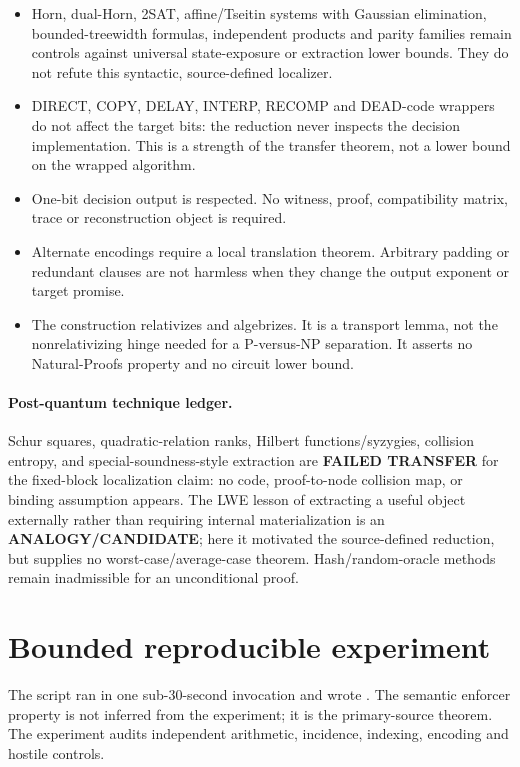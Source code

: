 \documentclass[11pt]{article}
\begin{document}
\begin{itemize}
\item Horn, dual-Horn, 2SAT, affine/Tseitin systems with Gaussian elimination,
bounded-treewidth formulas, independent products and parity families remain
controls against universal state-exposure or extraction lower bounds.  They
do not refute this syntactic, source-defined localizer.
\item DIRECT, COPY, DELAY, INTERP, RECOMP and DEAD-code wrappers do not affect
the target bits: the reduction never inspects the decision implementation.
This is a strength of the transfer theorem, not a lower bound on the wrapped
algorithm.
\item One-bit decision output is respected.  No witness, proof, compatibility
matrix, trace or reconstruction object is required.
\item Alternate encodings require a local translation theorem.  Arbitrary
padding or redundant clauses are not harmless when they change the output
exponent or target promise.
\item The construction relativizes and algebrizes.  It is a transport lemma,
not the nonrelativizing hinge needed for a P-versus-NP separation.  It asserts
no Natural-Proofs property and no circuit lower bound.
\end{itemize}

\paragraph{Post-quantum technique ledger.}
Schur squares, quadratic-relation ranks, Hilbert functions/syzygies,
collision entropy, and special-soundness-style extraction are
\textbf{FAILED TRANSFER} for the fixed-block localization claim: no code,
proof-to-node collision map, or binding assumption appears.  The LWE lesson
of extracting a useful object externally rather than requiring internal
materialization is an \textbf{ANALOGY/CANDIDATE}; here it motivated the
source-defined reduction, but supplies no worst-case/average-case theorem.
Hash/random-oracle methods remain inadmissible for an unconditional proof.

\section{Bounded reproducible experiment}

The script
 ran in one
sub-30-second invocation and wrote
.  The
semantic enforcer property is not inferred from the experiment; it is the
primary-source theorem.  The experiment audits independent arithmetic,
incidence, indexing, encoding and hostile controls.
\end{document}
